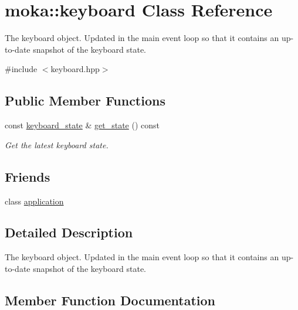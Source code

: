 \hypertarget{classmoka_1_1keyboard}{}\section{moka\+::keyboard Class Reference}
\label{classmoka_1_1keyboard}


The keyboard object. Updated in the main event loop so that it contains an up-\/to-\/date snapshot of the keyboard state.  




{\ttfamily \#include $<$keyboard.\+hpp$>$}

\subsection*{Public Member Functions}
\begin{DoxyCompactItemize}
\item 
const \mbox{\hyperlink{classmoka_1_1keyboard__state}{keyboard\+\_\+state}} \& \mbox{\hyperlink{classmoka_1_1keyboard_a9108627017ffc36ce1a6558f95591edf}{get\+\_\+state}} () const
\begin{DoxyCompactList}\small\item\em Get the latest keyboard state. \end{DoxyCompactList}\end{DoxyCompactItemize}
\subsection*{Friends}
\begin{DoxyCompactItemize}
\item 
class \mbox{\hyperlink{classmoka_1_1keyboard_a5b97104505447c42689b96b15027d832}{application}}
\end{DoxyCompactItemize}


\subsection{Detailed Description}
The keyboard object. Updated in the main event loop so that it contains an up-\/to-\/date snapshot of the keyboard state. 

\subsection{Member Function Documentation}
\mbox{\label{classmoka_1_1keyboard_a9108627017ffc36ce1a6558f95591edf}} 
